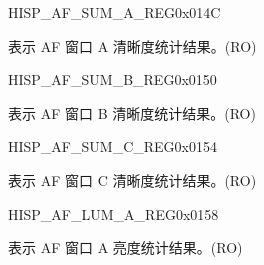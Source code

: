 \begin{register}{H}{ISP\_AF\_SUM\_A\_REG}{0x014C}\label{regdesc:ISPAFSUMAREG}
%
%
\regnewline%
\begin{regdesc}\begin{reglist}
\label{fielddesc:ISPAFSUMA}\item [ISP\_AF\_SUMA] 表示 AF 窗口 A 清晰度统计结果。(RO)
\end{reglist}\end{regdesc}
\end{register}


\begin{register}{H}{ISP\_AF\_SUM\_B\_REG}{0x0150}\label{regdesc:ISPAFSUMBREG}
%
%
\regnewline%
\begin{regdesc}\begin{reglist}
\label{fielddesc:ISPAFSUMB}\item [ISP\_AF\_SUMB] 表示 AF 窗口 B 清晰度统计结果。(RO)
\end{reglist}\end{regdesc}
\end{register}


\begin{register}{H}{ISP\_AF\_SUM\_C\_REG}{0x0154}\label{regdesc:ISPAFSUMCREG}
%
%
\regnewline%
\begin{regdesc}\begin{reglist}
\label{fielddesc:ISPAFSUMC}\item [ISP\_AF\_SUMC] 表示 AF 窗口 C 清晰度统计结果。(RO)
\end{reglist}\end{regdesc}
\end{register}


\begin{register}{H}{ISP\_AF\_LUM\_A\_REG}{0x0158}\label{regdesc:ISPAFLUMAREG}
%
%
\regnewline%
\begin{regdesc}\begin{reglist}
\label{fielddesc:ISPAFLUMA}\item [ISP\_AF\_LUMA] 表示 AF 窗口 A 亮度统计结果。(RO)
\end{reglist}\end{regdesc}
\end{register}


